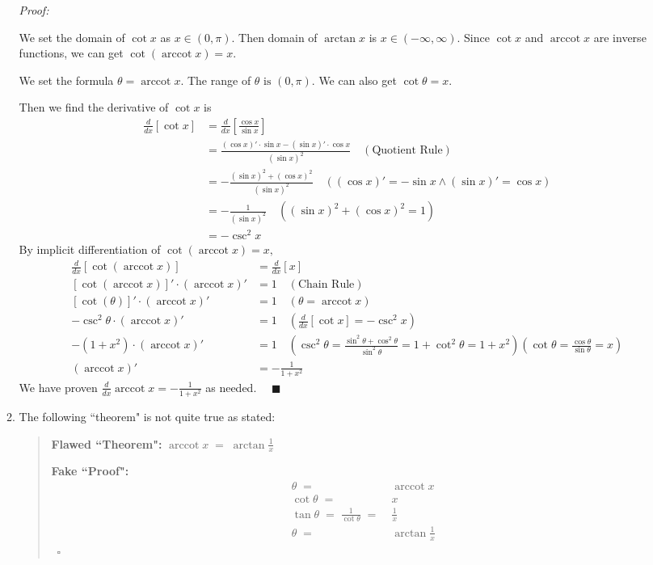 \documentclass[12pt]{exam}
\newcommand {\DS} [1] {${\displaystyle #1}$}
\newcommand{\vv}{\vspace{.1cm}}
\DeclareMathOperator{\arccot}{arccot}
\begin{document}
\begin{enumerate}
\begin{enumerate}
		\vv
		
		\emph{Proof:}
		
		\vv
		
		We set the domain of $\cot x$ as $x\in(0,\pi).$ Then domain of $\arctan x$ is $x\in(-\infty,\infty).$ Since $\cot x$ and $\arccot x$ are inverse functions, we can get $\cot(\arccot x)=x.$
		
		We set the formula $\theta=\arccot{x}$. The range of $\theta \mbox{ is } (0, \pi)$. We can also get $\cot\theta=x$.
		
		Then we find the derivative of $\cot x$ is
		\begin{align*}
		    \frac{d}{dx}[\cot x]&=\frac{d}{dx}[\frac{\cos x}{\sin x}]\\
		    &=\frac{(\cos x)'\cdot\sin x-(\sin x)'\cdot\cos x}{(\sin x)^2}\quad(\mbox{Quotient Rule})\\
		    &=-\frac{(\sin x)^2+(\cos x)^2}{(\sin x)^2}\quad((\cos x)'=-\sin x \land (\sin x)'=\cos x)\\
		    &=-\frac{1}{(\sin x)^2}\quad((\sin x)^2+(\cos x)^2=1)\\
		    &=-\csc^2 x
		\end{align*}
		By implicit differentiation of $\cot(\arccot x)=x,$
		\begin{align*}
		    \frac{d}{dx}[\cot(\arccot x)]&=\frac{d}{dx}[x]\\
		    [\cot(\arccot x)]'\cdot (\arccot x)'&=1\quad(\mbox{Chain Rule})\\
		    [\cot(\theta)]'\cdot (\arccot x)'&=1\quad(\theta=\arccot{x})\\
		    -\csc^2\theta\cdot(\arccot x)'&=1\quad(\frac{d}{dx}[\cot x]=-\csc^2 x)\\
		    -(1+x^2)\cdot(\arccot x)'&=1\quad(\csc^2\theta=\frac{\sin^2\theta+\cos^2\theta}{\sin^2\theta}=1+\cot^2\theta=1+x^2)(\cot\theta=\frac{\cos\theta}{\sin\theta}=x)\\
		    (\arccot x)'&=-\frac{1}{1+x^2}
		\end{align*}
		We have proven $\frac{d}{dx} \arccot x=-\frac{1}{1+x^2}$ as needed. $\quad\blacksquare$
		
		\item The following ``theorem" is not quite true as stated:
		
			\begin{quotation}
			{\bf Flawed ``Theorem":}   \DS{ \arccot x \; = \; \arctan \frac{1}{x} }
			
			{\bf Fake ``Proof":}   \vspace{-.5cm}
				\begin{align*}
					\theta \; =& \; \arccot x \\
					 \cot \theta \; =& \;  x \\
					 \tan \theta \; = \; \frac{1}{\cot \theta} \; =& \; \frac{1}{x} \\
					 \theta  \; =& \;  \arctan \frac{1}{x}  
				\end{align*}
				\ \hfill $\square$
			\end{quotation}


\end{enumerate}
\end{enumerate}
\end{document}
